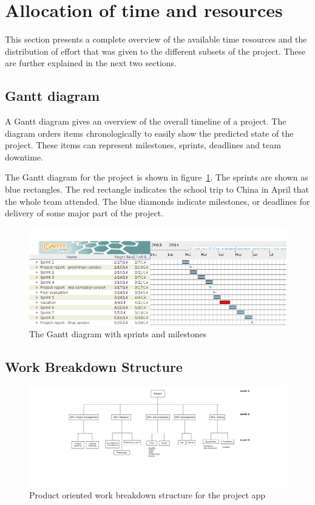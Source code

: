 \section{Allocation of time and resources}
This section presents a complete overview of the available time resources and the distribution of effort that was given to the different subsets of the project. These are further explained in the next two sections.

\subsection{Gantt diagram}
\label{sec:gantt}

A Gantt diagram gives an overview of the overall timeline of a project. The diagram orders items chronologically to easily show the predicted state of the project. These items can represent milestones, sprints, deadlines and team downtime. 

The Gantt diagram for the project is shown in figure~\ref{fig:gantt}. The sprints are shown as blue rectangles. The red rectangle indicates the school trip to China in April that the whole team attended. The blue diamonds indicate milestones, or deadlines for delivery of some major part of the project.


\begin{figure}[H]
\includegraphics[width=\textwidth]{ch/projectManagement/fig/gantt.png}
\caption{The Gantt diagram with sprints and milestones}
\label{fig:gantt}
\end{figure}


\subsection{Work Breakdown Structure}
\label{sec:wbs}

\begin{figure}[H]
\includegraphics[width=\textwidth, trim=9.5cm 6cm 8.5cm 0.9cm,clip]{ch/projectManagement/fig/wbs2.png}
\caption{Product oriented work breakdown structure for the project app}
\label{fig:wbs}
\end{figure}

